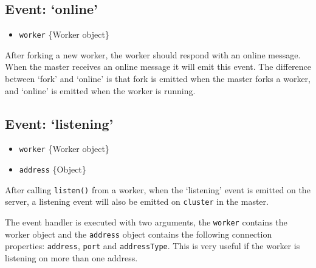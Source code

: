 \subsection{\texorpdfstring{Event:
`online'}{Event: online}}\label{event-online}

\begin{itemize}
\itemsep1pt\parskip0pt
\item
  \texttt{worker} \{Worker object\}
\end{itemize}

After forking a new worker, the worker should respond with an online
message. When the master receives an online message it will emit this
event. The difference between `fork' and `online' is that fork is
emitted when the master forks a worker, and `online' is emitted when the
worker is running.

\begin{Shaded}
\begin{Highlighting}[]
\NormalTok{(}\NormalTok{, }
  \NormalTok{(}\NormalTok{);}
\NormalTok{\});}
\end{Highlighting}
\end{Shaded}

\subsection{\texorpdfstring{Event:
`listening'}{Event: listening}}\label{event-listening}

\begin{itemize}
\itemsep1pt\parskip0pt
\item
  \texttt{worker} \{Worker object\}
\item
  \texttt{address} \{Object\}
\end{itemize}

After calling \texttt{listen()} from a worker, when the `listening'
event is emitted on the server, a listening event will also be emitted
on \texttt{cluster} in the master.

The event handler is executed with two arguments, the \texttt{worker}
contains the worker object and the \texttt{address} object contains the
following connection properties: \texttt{address}, \texttt{port} and
\texttt{addressType}. This is very useful if the worker is listening on
more than one address.

